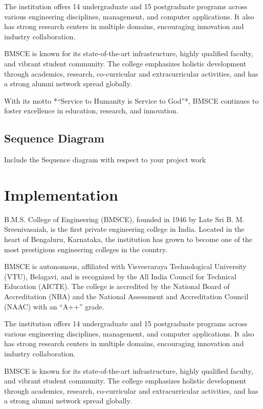 \documentclass[12pt,a4paper]{report}
\begin{document}
The institution offers 14 undergraduate and 15 postgraduate programs across various 
engineering disciplines, management, and computer applications. It also has strong research 
centers in multiple domains, encouraging innovation and industry collaboration. 

BMSCE is known for its state-of-the-art infrastructure, highly qualified faculty, and vibrant 
student community. The college emphasizes holistic development through academics, research, 
co-curricular and extracurricular activities, and has a strong alumni network spread 
globally. 

With its motto *“Service to Humanity is Service to God”*, BMSCE continues to foster 
excellence in education, research, and innovation.

\section{Sequence Diagram}
Include the Sequence diagram with respect to your project work

\chapter{Implementation}
B.M.S. College of Engineering (BMSCE), founded in 1946 by Late Sri B. M. Sreenivasaiah, 
is the first private engineering college in India. Located in the heart of Bengaluru, 
Karnataka, the institution has grown to become one of the most prestigious engineering 
colleges in the country. 

BMSCE is autonomous, affiliated with Visvesvaraya Technological University (VTU), Belagavi, 
and is recognized by the All India Council for Technical Education (AICTE). The college is 
accredited by the National Board of Accreditation (NBA) and the National Assessment and 
Accreditation Council (NAAC) with an “A++” grade.

The institution offers 14 undergraduate and 15 postgraduate programs across various 
engineering disciplines, management, and computer applications. It also has strong research 
centers in multiple domains, encouraging innovation and industry collaboration. 

BMSCE is known for its state-of-the-art infrastructure, highly qualified faculty, and vibrant 
student community. The college emphasizes holistic development through academics, research, 
co-curricular and extracurricular activities, and has a strong alumni network spread 
globally. 
\end{document}
